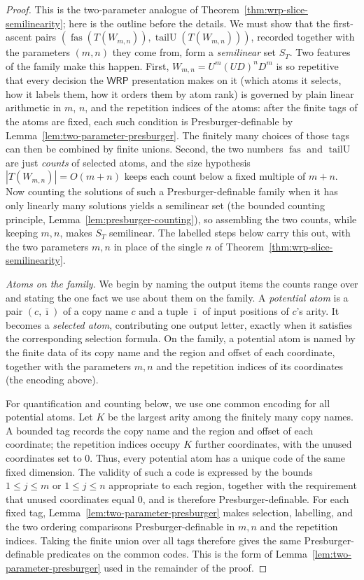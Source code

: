 \documentclass[11pt]{article}
\theoremstyle{definition}
\newcommand{\WRP}{\mathsf{WRP}}
\newcommand{\fas}{\operatorname{fas}}
\newcommand{\tailU}{\operatorname{tailU}}
\begin{document}
\begin{proof}
This is the two-parameter analogue of
Theorem~\ref{thm:wrp-slice-semilinearity}; here is the outline before the
details.  We must show that the first-ascent pairs
$(\fas(T(W_{m,n})),\tailU(T(W_{m,n})))$, recorded together with the parameters
$(m,n)$ they come from, form a \emph{semilinear} set $S_T$.
Two features of the family make this happen.  First, $W_{m,n}=U^m(UD)^nD^m$ is so
repetitive that every decision the $\WRP$ presentation makes on it (which atoms
it selects, how it labels them, how it orders them by atom rank) is governed by plain
linear arithmetic in $m$, $n$, and the repetition indices of the atoms: after
the finite tags of the atoms are fixed, each such condition is
Presburger-definable by Lemma~\ref{lem:two-parameter-presburger}.  The finitely
many choices of those tags can then be combined by finite unions.  Second,
the two numbers $\fas$ and $\tailU$
are just \emph{counts} of selected atoms, and the size hypothesis
$|T(W_{m,n})|=O(m+n)$ keeps each count below a fixed multiple of $m+n$.  Now
counting the solutions of such a Presburger-definable family when it has only linearly many
solutions yields a semilinear set (the bounded counting principle,
Lemma~\ref{lem:presburger-counting}), so assembling the two counts, while keeping
$m,n$, makes $S_T$ semilinear.  The labelled steps below carry this out, with the
two parameters $m,n$ in place of the single $n$ of
Theorem~\ref{thm:wrp-slice-semilinearity}.

\vspace{0.5em}
\noindent\emph{Atoms on the family.}  We begin by naming the output
items the counts range over and stating the one fact we use about them on the
family.  A \emph{potential atom} is a pair
$(c,\bar\imath)$ of a copy name $c$ and a tuple $\bar\imath$ of input positions of
$c$'s arity.  It becomes a \emph{selected atom}, contributing one output
letter, exactly when it satisfies the corresponding selection formula.  On
the family, a potential atom is named by the
finite data of its copy name and the region and offset of each coordinate, together
with the parameters $m,n$ and the repetition indices of its coordinates (the encoding
above).

For quantification and counting below, we use one common encoding for all
potential atoms.  Let $K$ be the largest arity among the finitely many copy
names.  A bounded tag records the copy name and the region and offset of each
coordinate; the repetition indices occupy $K$ further coordinates, with the
unused coordinates set to $0$.  Thus, every potential atom has a unique code of
the same fixed dimension.  The validity of such a code is expressed by the
bounds $1\le j\le m$ or $1\le j\le n$ appropriate to each region, together
with the requirement that unused coordinates equal $0$, and is therefore
Presburger-definable.  For each fixed tag, Lemma~\ref{lem:two-parameter-presburger}
makes selection, labelling, and the two ordering comparisons
Presburger-definable in $m,n$ and the repetition indices.  Taking the finite
union over all tags therefore gives the same Presburger-definable predicates on
the common codes.  This is the form of Lemma~\ref{lem:two-parameter-presburger}
used in the remainder of the proof.


\end{proof}
\end{document}
